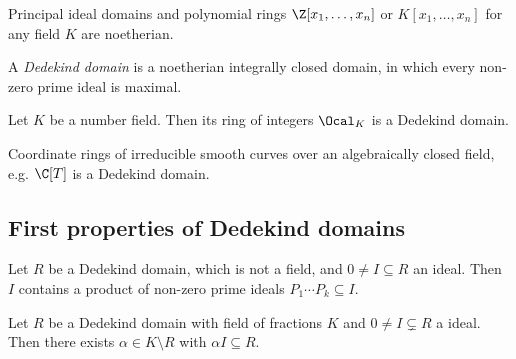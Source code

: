 \begin{exmp*}
	Principal ideal domains and polynomial rings \( \Z[x_1, \dotsc, x_n] \) or \( K[x_1, \dotsc, x_n] \) for any field \( K \) are noetherian.
\end{exmp*}

\begin{defn*}
	A \emph{Dedekind domain} is a noetherian integrally closed domain, in which every non-zero prime ideal is maximal.
\end{defn*}

\begin{thmn}
	Let \( K \) be a number field.
	Then its ring of integers \( \Ocal_K \) is a Dedekind domain.
\end{thmn}

\begin{exmp*}
	Coordinate rings of irreducible smooth curves over an algebraically closed field, e.g. \( \C[T] \) is a Dedekind domain.
\end{exmp*}

\subsection*{First properties of Dedekind domains}

\begin{lem}
	Let \( R \) be a Dedekind domain, which is not a field, and \( 0 \neq I \subseteq R \) an ideal.
	Then \( I \) contains a product of non-zero prime ideals \( P_1 \dotsm P_k \subseteq I \).
\end{lem}

\begin{lem}
	Let \( R \) be a Dedekind domain with field of fractions \( K \) and \( 0 \neq I \subsetneq R \) a ideal.
	Then there exists \( \alpha \in K \setminus R \) with \( \alpha I \subseteq R \).
\end{lem}
